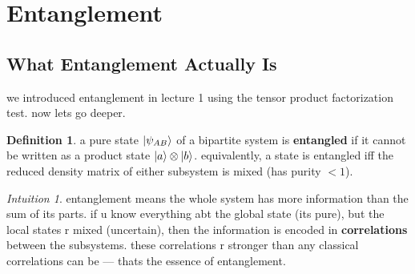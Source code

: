 \documentclass[11pt,a4paper]{article}
\theoremstyle{definition}
\newtheorem{definition}{Definition}[section]
\theoremstyle{remark}
\newtheorem*{intuition}{Intuition}
\begin{document}
\section{Entanglement}

\subsection{What Entanglement Actually Is}

we introduced entanglement in lecture 1 using the tensor product factorization test. now lets go deeper.

\begin{definition}
a pure state $\ket{\psi_{AB}}$ of a bipartite system is \textbf{entangled} if it cannot be written as a product state $\ket{a} \otimes \ket{b}$. equivalently, a state is entangled iff the reduced density matrix of either subsystem is mixed (has purity $< 1$).
\end{definition}

\begin{intuition}
entanglement means the whole system has more information than the sum of its parts. if u know everything abt the global state (its pure), but the local states r mixed (uncertain), then the information is encoded in \textbf{correlations} between the subsystems. these correlations r stronger than any classical correlations can be --- thats the essence of entanglement.
\end{intuition}

\begin{center}
\end{center}
\end{document}
